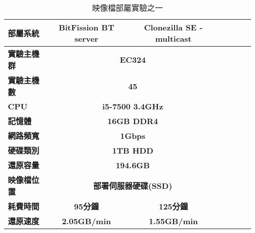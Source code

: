 \begin{table}[!htbp]
\centering
\caption{映像檔部屬實驗之一}
\label{exp1}
\begin{adjustbox}{max width=0.92\textwidth}
\begin{tabular}{lcccccc}

\toprule
\multicolumn{1}{l}{\textbf{部屬系統}} & \textbf{BitFission BT server} & \textbf{Clonezilla SE - multicast} \\ \midrule
\multicolumn{1}{l}{\textbf{實驗主機群}} & \multicolumn{2}{c}{\textbf{EC324}} \\
\multicolumn{1}{l}{\textbf{實驗主機數}} & \multicolumn{2}{c}{\textbf{45}} \\
\multicolumn{1}{l}{\textbf{CPU}} & \multicolumn{2}{c}{\textbf{i5-7500 3.4GHz}} \\
\multicolumn{1}{l}{\textbf{記憶體}} & \multicolumn{2}{c}{\textbf{16GB DDR4}} \\
\multicolumn{1}{l}{\textbf{網路頻寬}} & \multicolumn{2}{c}{\textbf{1Gbps}} \\
\multicolumn{1}{l}{\textbf{硬碟類別}} & \multicolumn{2}{c}{\textbf{1TB HDD}} \\
\multicolumn{1}{l}{\textbf{還原容量}} & \multicolumn{2}{c}{\textbf{194.6GB}} \\
\multicolumn{1}{l}{\textbf{映像檔位置}} & \multicolumn{2}{c}{\textbf{部署伺服器硬碟(SSD)}} \\
\multicolumn{1}{l}{\textbf{耗費時間}} & \textbf{95分鐘} & \textbf{125分鐘} \\
\multicolumn{1}{l}{\textbf{還原速度}} & \textbf{2.05GB/min} & \textbf{1.55GB/min} \\

\bottomrule
\end{tabular}
\end{adjustbox}
\end{table}
